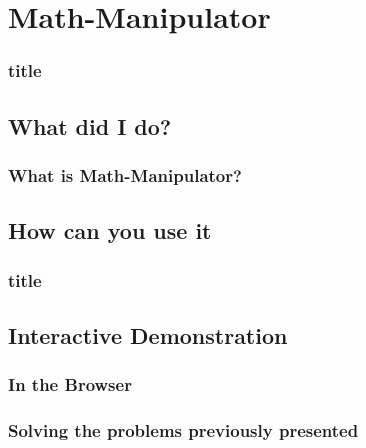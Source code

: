 \section{Math-Manipulator}
    \begin{frame}
        \frametitle{title}
    \end{frame}

    \subsection{What did I do?}
        \begin{frame}
            \frametitle{What is Math-Manipulator?}


        \end{frame}

    \subsection{How can you use it}
        \begin{frame}
            \frametitle{title}
        \end{frame}
    
    \subsection{Interactive Demonstration}
        \begin{frame}
            \frametitle{In the Browser}


        \end{frame}

        \begin{frame}
            \frametitle{Solving the problems previously presented}

            
        \end{frame}